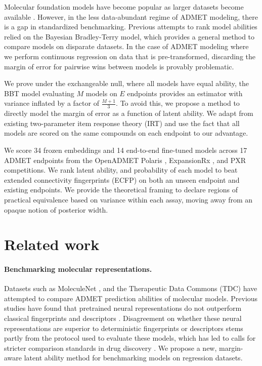 \documentclass{article}
\begin{document}

Molecular foundation models \citep{Lin2023-jz, wood2026umafamilyuniversalmodels} have become popular as larger datasets become available \citep{zinc20, pubchem, chembl}. However, in the less data-abundant regime of ADMET modeling, there is a gap in standardized benchmarking. Previous attempts to rank model abilities \citep{praski2025} relied on the Bayesian Bradley-Terry model, which provides a general method to compare models on disparate datasets. In the case of ADMET modeling where we perform continuous regression on data that is pre-transformed, discarding the margin of error for pairwise wins between models is provably problematic.

We prove under the exchangeable null, where all models have equal ability, the BBT model evaluating $M$ models on $E$ endpoints provides an estimator with variance inflated by a factor of $\frac{M+1}{3}$. To avoid this, we propose a method to directly model the margin of error as a function of latent ability. We adapt from existing two-parameter item response theory (IRT) \citep{lord1968, birnbaum1968} and use the fact that all models are scored on the same compounds on each endpoint to our advantage.

We score 34 frozen embeddings and 14 end-to-end fine-tuned models across 17 ADMET endpoints from the OpenADMET Polaris \citep{asap2025, polaris}, ExpansionRx \citep{expansionrx}, and PXR \citep{pxr} competitions. We rank latent ability, and probability of each model to beat extended connectivity fingerprints (ECFP) on both an unseen endpoint and existing endpoints. We provide the theoretical framing to declare regions of practical equivalence based on variance within each assay, moving away from an opaque notion of posterior width.

\section{Related work}
\paragraph{Benchmarking molecular representations.} Datasets such as MoleculeNet \citep{wu2018}, and the Therapeutic Data Commons (TDC) \citep{huang2021} have attempted to compare ADMET prediction abilities of molecular models. Previous studies have found that pretrained neural representations do not outperform classical fingerprints and descriptors \citep{jiang2021, vantilborg2022, praski2025}. Disagreement on whether these neural representations are superior to deterministic fingerprints or descriptors stems partly from the protocol used to evaluate these models, which has led to calls for stricter comparison standards in drug discovery \citep{wognum2024, ash2025}. We propose a new, margin-aware latent ability method for benchmarking models on regression datasets.
\end{document}
